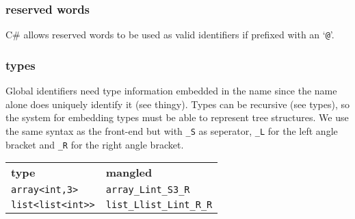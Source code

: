 \subsubsection{reserved words}
C\# allows reserved words to be used as valid identifiers if prefixed with an `\verb|@|'\cite{msdn_identifiers}.

\subsubsection{types}
Global identifiers need type information embedded in the name since the name alone does uniquely identify it (see thingy).
Types can be recursive (see types), so the system for embedding types must be able to represent tree structures.
We use the same syntax as the front-end but with \verb|_S| as seperator, \verb|_L| for the left angle bracket and \verb|_R| for the right angle bracket.

\begin{tabular}{ll}
\textbf{type}          & \textbf{mangled} \\
\verb|array<int,3>|    & \verb|array_Lint_S3_R| \\
\verb|list<list<int>>| & \verb|list_Llist_Lint_R_R| \\
\end{tabular}

